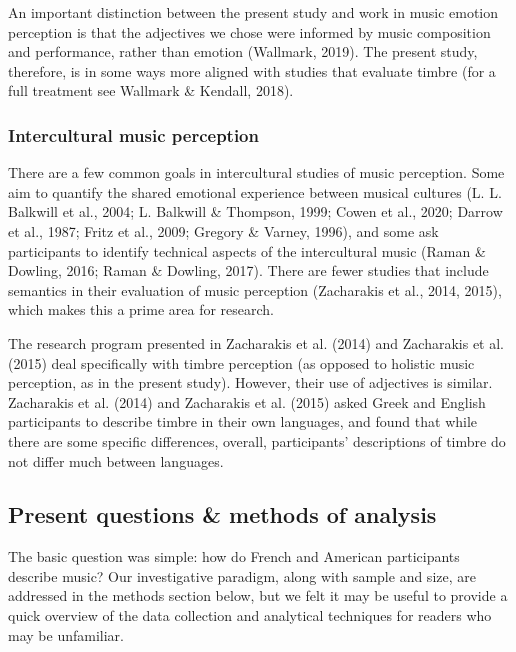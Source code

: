 \documentclass[
  english,
  man,floatsintext]{apa6}
\begin{document}
An important distinction between the present study and work in music emotion perception is that the adjectives we chose were informed by music composition and performance, rather than emotion (Wallmark, 2019). The present study, therefore, is in some ways more aligned with studies that evaluate timbre (for a full treatment see Wallmark \& Kendall, 2018).

\hypertarget{intercultural-music-perception}{%
\subsubsection{Intercultural music perception}\label{intercultural-music-perception}}

There are a few common goals in intercultural studies of music perception. Some aim to quantify the shared emotional experience between musical cultures (L. L. Balkwill et al., 2004; L. Balkwill \& Thompson, 1999; Cowen et al., 2020; Darrow et al., 1987; Fritz et al., 2009; Gregory \& Varney, 1996), and some ask participants to identify technical aspects of the intercultural music (Raman \& Dowling, 2016; Raman \& Dowling, 2017). There are fewer studies that include semantics in their evaluation of music perception (Zacharakis et al., 2014, 2015), which makes this a prime area for research.

The research program presented in Zacharakis et al. (2014) and Zacharakis et al. (2015) deal specifically with timbre perception (as opposed to holistic music perception, as in the present study). However, their use of adjectives is similar. Zacharakis et al. (2014) and Zacharakis et al. (2015) asked Greek and English participants to describe timbre in their own languages, and found that while there are some specific differences, overall, participants' descriptions of timbre do not differ much between languages.

\hypertarget{present-questions-methods-of-analysis}{%
\subsection{Present questions \& methods of analysis}\label{present-questions-methods-of-analysis}}

The basic question was simple: how do French and American participants describe music? Our investigative paradigm, along with sample and size, are addressed in the methods section below, but we felt it may be useful to provide a quick overview of the data collection and analytical techniques for readers who may be unfamiliar.
\end{document}
